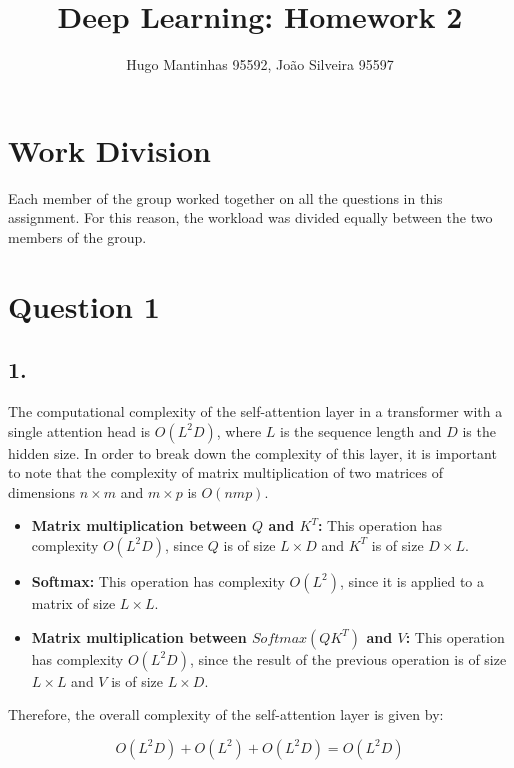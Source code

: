 \documentclass[11pt]{article}
\begin{document}
\title{Deep Learning: Homework 2}
\author{Hugo Mantinhas 95592, João Silveira 95597}

\maketitle

\section*{Work Division}

Each member of the group worked together on all the questions in this assignment. For this reason, the workload was divided equally between the two members of the group.

\section*{Question 1}

\subsection*{1.}

The computational complexity of the self-attention layer in a transformer with a single attention head is \(O(L^2D)\), where \(L\) is the sequence length and \(D\) is the hidden size. In order to break down the complexity of this layer, it is important to note that the complexity of matrix multiplication of two matrices of dimensions \(n \times m\) and \(m \times p\) is \(O(nmp)\).

\begin{itemize}
    \item \textbf{Matrix multiplication between \(Q\) and \(K^T\):} This operation has complexity \(O(L^2D)\), since \(Q\) is of size \(L \times D\) and \(K^T\) is of size \(D \times L\).
    \item \textbf{Softmax:} This operation has complexity \(O(L^2)\), since it is applied to a matrix of size \(L \times L\).
    \item \textbf{Matrix multiplication between \(Softmax(QK^T)\) and \(V\):} This operation has complexity \(O(L^2D)\), since the result of the previous operation is of size \(L \times L\) and \(V\) is of size \(L \times D\).
\end{itemize}

Therefore, the overall complexity of the self-attention layer is given by: 

\[
O(L^2D) + O(L^2) + O(L^2D) = O(L^2D)
\]
\end{document}
